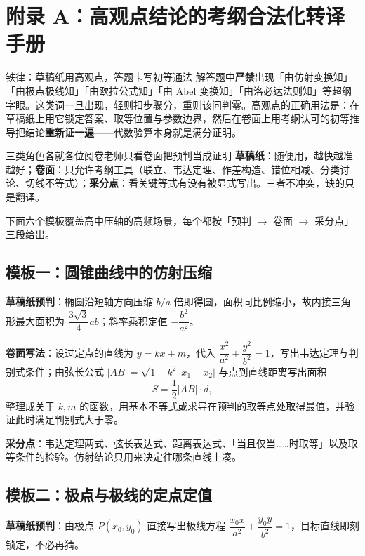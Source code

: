 \section{附录 A：高观点结论的考纲合法化转译手册}\label{app:legal}

\begin{commonerror}{铁律：草稿纸用高观点，答题卡写初等通法}
解答题中\textbf{严禁}出现「由仿射变换知」「由极点极线知」「由欧拉公式知」「由 Abel 变换知」「由洛必达法则知」等超纲字眼。这类词一旦出现，轻则扣步骤分，重则该问判零。高观点的正确用法是：在草稿纸上用它锁定答案、取等位置与参数边界，然后在卷面上用考纲认可的初等推导把结论\textbf{重新证一遍}——代数验算本身就是满分证明。
\end{commonerror}

\begin{conccard}[三级]{三类角色各就各位}{阅卷老师只看卷面}{把预判当成证明}
\textbf{草稿纸}：随便用，越快越准越好；\textbf{卷面}：只允许考纲工具（联立、韦达定理、作差构造、错位相减、分类讨论、切线不等式）；\textbf{采分点}：看关键等式有没有被显式写出。三者不冲突，缺的只是翻译。
\end{conccard}

下面六个模板覆盖高中压轴的高频场景，每个都按「预判 $\to$ 卷面 $\to$ 采分点」三段给出。

\subsection*{模板一：圆锥曲线中的仿射压缩}

\textbf{草稿纸预判}：椭圆沿短轴方向压缩 $b/a$ 倍即得圆，面积同比例缩小，故内接三角形最大面积为 $\dfrac{3\sqrt3}{4}ab$；斜率乘积定值 $-\dfrac{b^2}{a^2}$。

\textbf{卷面写法}：设过定点的直线为 $y=kx+m$，代入 $\dfrac{x^2}{a^2}+\dfrac{y^2}{b^2}=1$，写出韦达定理与判别式条件；由弦长公式 $|AB|=\sqrt{1+k^2}\,|x_1-x_2|$ 与点到直线距离写出面积
\[
  S=\frac12|AB|\cdot d ,
\]
整理成关于 $k,m$ 的函数，用基本不等式或求导在预判的取等点处取得最值，并验证此时满足判别式大于零。

\textbf{采分点}：韦达定理两式、弦长表达式、距离表达式、「当且仅当……时取等」以及取等条件的检验。仿射结论只用来决定往哪条直线上凑。

\subsection*{模板二：极点与极线的定点定值}

\textbf{草稿纸预判}：由极点 $P(x_0,y_0)$ 直接写出极线方程 $\dfrac{x_0x}{a^2}+\dfrac{y_0y}{b^2}=1$，目标直线即刻锁定，不必再猜。

